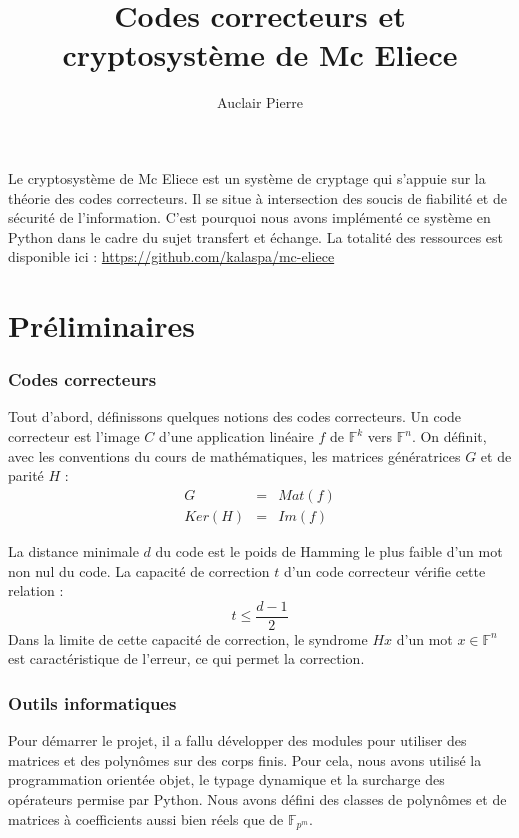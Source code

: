 \documentclass{article}
\title{Codes correcteurs et cryptosystème de Mc Eliece}
\author{Auclair Pierre}
\begin{document}
	\maketitle

	Le cryptosystème de Mc Eliece est un système de cryptage qui s'appuie sur la théorie des codes correcteurs.
	Il se situe à intersection des soucis de fiabilité et de sécurité de l'information.
	C'est pourquoi nous avons implémenté ce système en Python dans le cadre du sujet transfert et échange.
	La totalité des ressources est disponible ici : \url{https://github.com/kalaspa/mc-eliece}


	\part*{Préliminaires}

		\section*{Codes correcteurs}
			\cite{04cc}
			Tout d'abord, définissons quelques notions des codes correcteurs.
			Un code correcteur est l'image $C$ d'une application linéaire $f$ de $\mathbb{F}^{k}$ vers $\mathbb{F}^{n}$.
			On définit, avec les conventions du cours de mathématiques, les matrices génératrices $G$ et de parité $H$ :
			\begin{eqnarray*}
				G &=& Mat(f) \\
				Ker(H) &=& Im(f)
			\end{eqnarray*}

			La distance minimale $d$ du code est le poids de Hamming le plus faible d'un mot non nul du code.
			La capacité de correction $t$ d'un code correcteur vérifie cette relation :
			$$
				t \leq \frac{d-1}{2}
			$$
			Dans la limite de cette capacité de correction, le syndrome $Hx$ d'un mot $x \in \mathbb{F}^{n}$ est caractéristique de l'erreur, ce qui permet la correction.

		\section*{Outils informatiques}
			Pour démarrer le projet, il a fallu développer des modules pour utiliser des matrices et des polynômes sur des corps finis.
			Pour cela, nous avons utilisé la programmation orientée objet, le typage dynamique et la surcharge des opérateurs permise par Python.
			Nous avons défini des classes de polynômes et de matrices à coefficients aussi bien réels que de $\mathbb{F}_{p^{m}}$.
\end{document}

